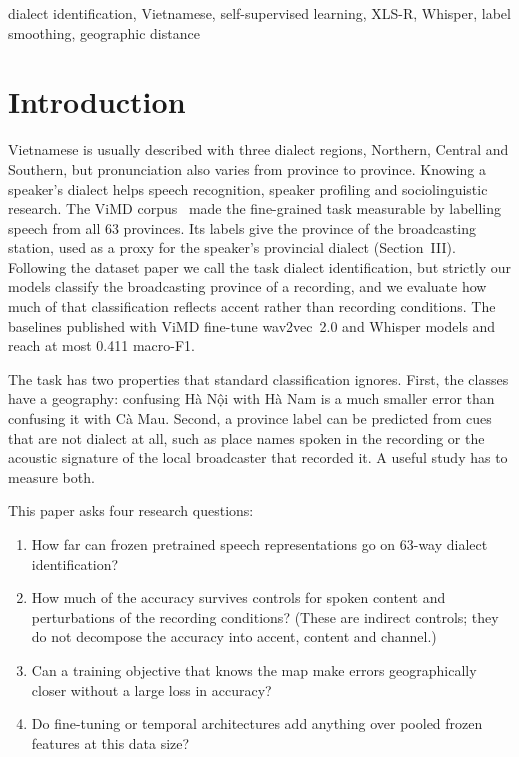 \documentclass[conference]{IEEEtran}
\newcommand{\vn}[1]{\foreignlanguage{vietnamese}{#1}}
\begin{document}
\begin{IEEEkeywords}
dialect identification, Vietnamese, self-supervised learning, XLS-R, Whisper, label smoothing, geographic distance
\end{IEEEkeywords}

\section{Introduction}
Vietnamese is usually described with three dialect regions, Northern, Central and Southern, but pronunciation also varies from province to province. Knowing a speaker's dialect helps speech recognition, speaker profiling and sociolinguistic research. The ViMD corpus~\cite{vimd} made the fine-grained task measurable by labelling speech from all 63 provinces. Its labels give the province of the broadcasting station, used as a proxy for the speaker's provincial dialect (Section~III). Following the dataset paper we call the task dialect identification, but strictly our models classify the broadcasting province of a recording, and we evaluate how much of that classification reflects accent rather than recording conditions. The baselines published with ViMD fine-tune wav2vec~2.0 and Whisper models and reach at most 0.411 macro-F1.

The task has two properties that standard classification ignores. First, the classes have a geography: confusing \vn{Hà Nội} with \vn{Hà Nam} is a much smaller error than confusing it with \vn{Cà Mau}. Second, a province label can be predicted from cues that are not dialect at all, such as place names spoken in the recording or the acoustic signature of the local broadcaster that recorded it. A useful study has to measure both.

This paper asks four research questions:
\begin{enumerate}
\item[\textbf{RQ1}] How far can frozen pretrained speech representations go on 63-way dialect identification?
\item[\textbf{RQ2}] How much of the accuracy survives controls for spoken content and perturbations of the recording conditions? (These are indirect controls; they do not decompose the accuracy into accent, content and channel.)
\item[\textbf{RQ3}] Can a training objective that knows the map make errors geographically closer without a large loss in accuracy?
\item[\textbf{RQ4}] Do fine-tuning or temporal architectures add anything over pooled frozen features at this data size?
\end{enumerate}
\end{document}
